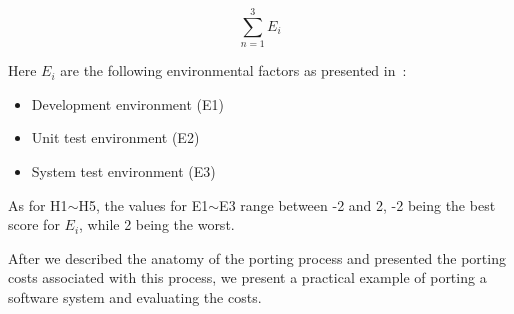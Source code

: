 \begin{equation} \label{eq:hfi}
\sum_{n=1}^{3} E_i
\end{equation}

Here $E_i$ are the following environmental factors as presented in~\cite{hakuta}:
\begin{itemize}
    \item Development environment (E1)
    \item Unit test environment (E2)
    \item System test environment (E3)
\end{itemize}

As for H1$\sim$H5, the values for E1$\sim$E3 range between -2 and 2, -2 being the best
score for $E_i$, while 2 being the worst.

After we described the anatomy of the porting process and presented the porting
costs associated with this process, we present a practical example of porting a
software system and evaluating the costs.
